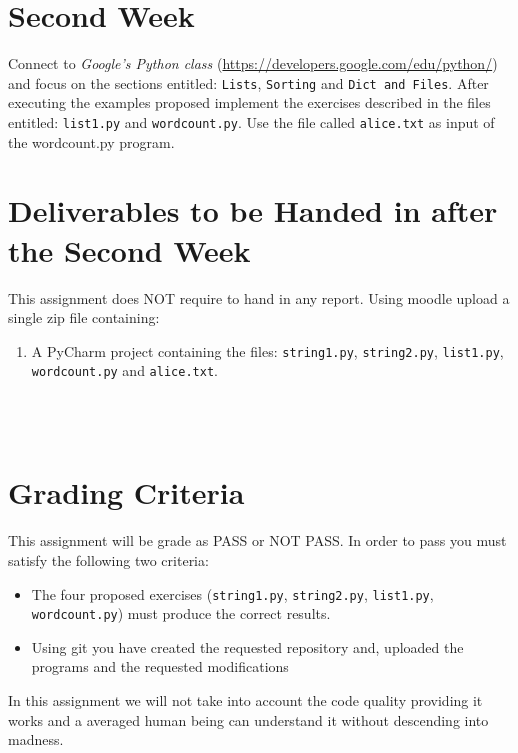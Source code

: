 \documentclass[12pt]{article} %
\begin{document}


\section{Second Week}
Connect to \textit{Google's Python class} (\url{https://developers.google.com/edu/python/}) and focus on the sections entitled: \texttt{Lists}, \texttt {Sorting} and \texttt {Dict and Files}. After executing the examples proposed implement the exercises described in the files entitled: \texttt{list1.py} and \texttt{wordcount.py}. Use the file called \texttt{alice.txt} as input of the wordcount.py program.

\section{Deliverables to be Handed in after the Second Week}

\begin{minipage}{\linewidth}
\begin{framed}
This assignment does NOT require to hand in any report. Using moodle upload a single zip file containing:
\begin{enumerate}
\item A PyCharm project containing the files: \texttt{string1.py}, \texttt{string2.py}, \texttt{list1.py}, \texttt{wordcount.py} and \texttt{alice.txt}.
\end{enumerate}
\end{framed}
\end{minipage}\\\\

\section{Grading Criteria}

This assignment will be grade as PASS or NOT PASS.
In order to pass you must satisfy the following two criteria:
\begin{itemize}
 \item The four proposed exercises (\texttt{string1.py}, \texttt{string2.py}, \texttt{list1.py}, \texttt{wordcount.py}) must produce the correct results.   
 \item Using git you have created the requested repository and, uploaded the programs and the requested modifications
\end{itemize}
 In this assignment we will not take into account the code quality providing it works and a averaged human being can understand it without descending into madness.
\end{document}
